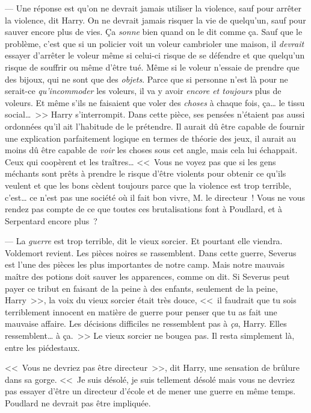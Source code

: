 --- Une réponse est qu'on ne devrait jamais utiliser la violence, sauf pour arrêter la violence, dit Harry. On ne devrait jamais risquer la vie de quelqu'un, sauf pour sauver encore plus de vies. Ça \emph{sonne} bien quand on le dit comme ça. Sauf que le problème, c'est que si un policier voit un voleur cambrioler une maison, il \emph{devrait} essayer d'arrêter le voleur même si celui-ci risque de se défendre et que quelqu'un risque de souffrir ou même d'être tué. Même si le voleur n'essaie de prendre que des bijoux, qui ne sont que des \emph{objets}. Parce que si personne n'est là pour ne serait-ce \emph{qu'incommoder} les voleurs, il va y avoir \emph{encore et toujours} plus de voleurs. Et même s'ils ne faisaient que voler des \emph{choses} à chaque fois, ça… le tissu social…~>> Harry s'interrompit. Dans cette pièce, ses pensées n'étaient pas aussi ordonnées qu'il ait l'habitude de le prétendre. Il aurait dû être capable de fournir une explication parfaitement logique en termes de théorie des jeux, il aurait au moins dû être capable de \emph{voir} les choses sous cet angle, mais cela lui échappait. Ceux qui coopèrent et les traîtres… <<~Vous ne voyez pas que si les gens méchants sont prêts à prendre le risque d'être violents pour obtenir ce qu'ils veulent et que les bons cèdent toujours parce que la violence est trop terrible, c'est… ce n'est pas une société où il fait bon vivre, M. le directeur~! Vous ne vous rendez pas compte de ce que toutes ces brutalisations font à Poudlard, et à Serpentard encore plus~?

--- La \emph{guerre} est trop terrible, dit le vieux sorcier. Et pourtant elle viendra. Voldemort revient. Les pièces noires se rassemblent. Dans cette guerre, Severus est l'une des pièces les plus importantes de notre camp. Mais notre mauvais maître des potions doit sauver les apparences, comme on dit. Si Severus peut payer ce tribut en faisant de la peine à des enfants, seulement de la peine, Harry~>>, la voix du vieux sorcier était très douce, <<~il faudrait que tu sois terriblement innocent en matière de guerre pour penser que tu as fait une mauvaise affaire. Les décisions difficiles ne ressemblent pas à \emph{ça}, Harry. Elles ressemblent… à ça.~>> Le vieux sorcier ne bougea pas. Il resta simplement là, entre les piédestaux.

<<~Vous ne devriez pas être directeur~>>, dit Harry, une sensation de brûlure dans sa gorge. <<~Je suis désolé, je suis tellement désolé mais vous ne devriez pas essayer d'être un directeur d'école et de mener une guerre en même temps. Poudlard ne devrait pas être impliquée.

